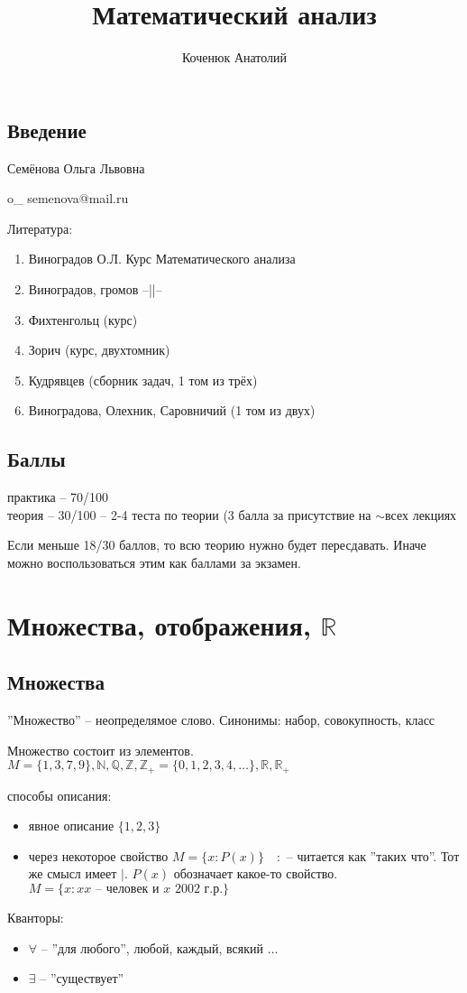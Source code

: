 \documentclass{book}
\author{Коченюк Анатолий}
\title{Математический анализ}
\newcommand\N{\ensuremath{\mathbb{N}}}
\newcommand\R{\ensuremath{\mathbb{R}}}
\newcommand\Z{\ensuremath{\mathbb{Z}}}
\newcommand\Q{\ensuremath{\mathbb{Q}}}
\theoremstyle{definition}
\begin{document}
    \maketitle
    \tableofcontents
    \newpage
    \section{Введение}
    Семёнова Ольга Львовна

    o\_ semenova@mail.ru

   
   Литература: \begin{enumerate}
       \item Виноградов О.Л. Курс Математического анализа
       \item Виноградов, громов --||--
       \item Фихтенгольц (курс)
       \item Зорич (курс, двухтомник)
       \item Кудрявцев (сборник задач, 1 том из трёх)
       \item Виноградова, Олехник, Саровничий (1 том из двух)
   \end{enumerate}

    \section{Баллы}

    практика -- 70/100\\
    теория -- 30/100 -- 2-4 теста по теории (3 балла за присутствие на $\sim $всех лекциях

    Если меньше 18/30 баллов, то всю теорию нужно будет пересдавать. Иначе можно воспользоваться этим как баллами за экзамен.

    \chapter{Множества, отображения, $\R$}

    \section{Множества}
    ''Множество'' -- неопределямое слово. Синонимы: набор, совокупность, класс

    Множество состоит из элементов. $M = \{1,3,7,9\}, \N , \Q, \Z , \Z_+ = \{0,1,2,3,4,\ldots\}, \R, \R_+$

    способы описания:
    \begin{itemize}
        \item явное описание $\{1, 2, 3\}$
        \item через некоторое свойство $M = \{x: P(x)\}\quad :$ -- читается как ''таких что''. Тот же смысл имеет $\mid$.
            $P(x)$ обозначает какое-то свойство.
            $M = \{x:x\text{$x$ -- человек и $x$ 2002 г.р.}\}$
    \end{itemize}
    Кванторы:
    \begin{itemize}
        \item $\forall $ -- ''для любого'', любой, каждый, всякий $\ldots$
        \item $\exists $ -- ''существует''
    \end{itemize}
\end{document}
